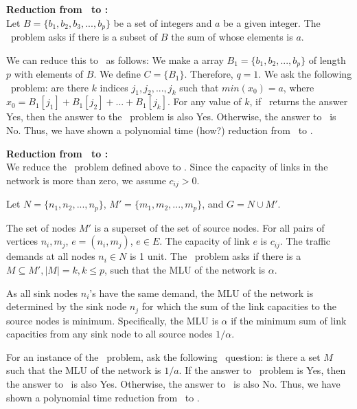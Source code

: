 {\vsp
\noindent\textbf{Reduction from \subsetsum\ to \minsubsetsum:} \\
Let $B = \{ b_1, b_2, b_3, ..., b_p\}$ be a set of integers and $a$ be a given integer. The \subsetsum\ problem asks if there is a subset of $B$ the sum of whose elements is $a$. 

We can reduce this to \minsubsetsum\ as follows: We make a array $B_1 = \{b_1, b_2, ..., b_p\}$ of length $p$ with elements of $B$. We define $C = \{ B_1 \}$. Therefore, $q = 1$. 
We ask the following \minsubsetsum\ problem: are there $k$ indices $j_1, j_2, ..., j_k$ such that $\textit{min} (x_0) = a$, where $ x_0 = B_1[j_1] + B_1[j_2]  + ... + B_1[j_k]$. For any value of $k$, if \minsubsetsum\ returns the answer Yes, then the answer to the \subsetsum\ problem is also Yes. Otherwise, the answer to \subsetsum\ is No. Thus, we have shown a polynomial time (how?)  reduction from \subsetsum\ to \minsubsetsum.

\vsp
\noindent\textbf{Reduction from \minsubsetsum\ to \optloc:}\\ 
We reduce the \minsubsetsum\ problem defined above to \optloc.  Since the capacity of links in the network is more than zero, we assume $c_{ij} > 0$. %

Let $N = \{n_1, n_2, ..., n_p\}$, $M' = \{m_1, m_2, ..., m_p\}$, and $ G = N \cup M'$.




The set of nodes $M'$ is a superset of the set of source nodes. For all pairs of vertices $n_i, m_j$, $e = (n_i, m_j)$, $e \in E$. The capacity of link $e$ is $c_{ij}$.  The traffic demands at all nodes $n_i \in N$ is 1 unit. The \optloc\ problem asks if there is a $ M \subseteq M', |M| = k, k \leq p$,  such that the MLU of the network is $\alpha$.


As all sink nodes $n_i$'s have the same demand, the MLU of the network is  determined by the sink node $n_j$ for which the sum of the link capacities to the source nodes is minimum. Specifically, the MLU is $\alpha$ if the minimum sum of link capacities from any sink node to all source nodes $1/\alpha$. 

For an instance of the \minsubsetsum\ problem, ask the following \optloc\ question: is there a set $M$ such that the MLU of the network is $1/a$. If the answer to \optloc\ problem is Yes, then the answer to  \minsubsetsum\ is also Yes. Otherwise, the answer to \minsubsetsum\ is also No. Thus, we have shown a polynomial time reduction from \minsubsetsum\ to \optloc.

}
